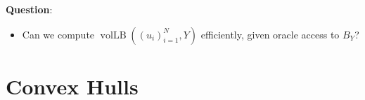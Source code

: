 \documentclass[12pt]{article}
\newcommand\eps{\varepsilon}
\newcommand{\eqdef}{\triangleq}
\DeclareMathOperator{\vollb}{volLB}
\begin{document}
% 

\medskip\noindent
\textbf{Question}:
\begin{itemize}
\item Can we compute $\vollb((u_i)_{i = 1}^N, Y)$ efficiently, given
  oracle access to $B_Y$?
\end{itemize}

\section{Convex Hulls}
\end{document}
